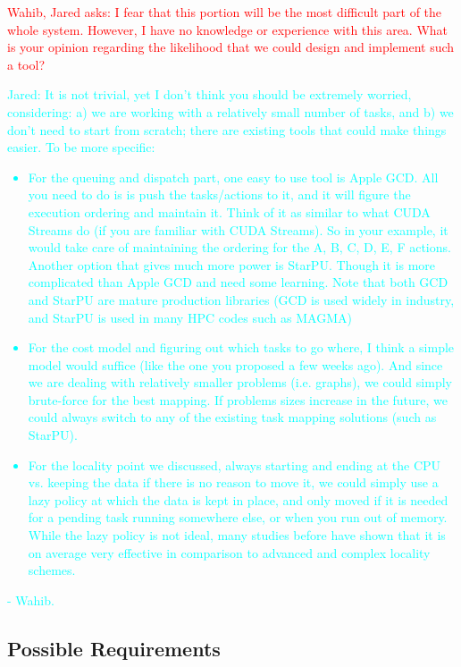 \documentclass{article}
\newcommand{\JaredRfromW}[1]    {\textcolor{cyan}{Jared: #1 - Wahib.}}
\newcommand{\WahibQfromJO}[1]   {\textcolor{red}{Wahib, Jared asks: #1}}
\begin{document}
\WahibQfromJO{I fear that this portion will be the most difficult part of the
whole system. However, I have no knowledge or experience with this area. What is
your opinion regarding the likelihood that we could design and implement such a
tool?}\\
\JaredRfromW{It is not trivial, yet I don’t think you should be extremely
worried, considering: a) we are working with a relatively small number of tasks,
and b) we don’t need to start from scratch; there are existing tools that could
make things easier. To be more specific:
\begin{itemize}
\item{For the queuing and dispatch part, one
easy to use tool is Apple GCD. All you need to do is is push the tasks/actions
to it, and it will figure the execution ordering and maintain it. Think of it as
similar to what CUDA Streams do (if you are familiar with CUDA Streams). So in
your example, it would take care of maintaining the ordering for the A, B, C, D,
E, F actions. Another option that gives much more power is StarPU. Though it is
more complicated than Apple GCD and need some learning. Note that both GCD and
StarPU are mature production libraries (GCD is used widely in industry, and
StarPU is used in many HPC codes such as MAGMA)}
\item{For the cost model and figuring
out which tasks to go where, I think a simple model would suffice (like the one
you proposed a few weeks ago). And since we are dealing with relatively smaller
problems (i.e. graphs), we could simply brute-force for the best mapping. If
problems sizes increase in the future, we could always switch to any of the
existing task mapping solutions (such as StarPU).}
\item{For the locality point we
discussed, always starting and ending at the CPU vs. keeping the data if there
is no reason to move it, we could simply use a lazy policy at which the data is
kept in place, and only moved if it is needed for a pending task running
somewhere else, or when you run out of memory. While the lazy policy is not
ideal, many studies before have shown that it is on average very effective in
comparison to advanced and complex locality schemes.}
\end{itemize}}

\subsection{Possible Requirements}

\end{document}
